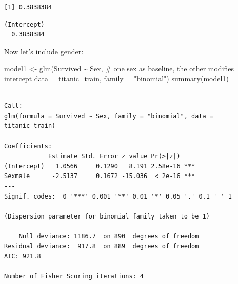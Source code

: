\documentclass[
  letterpaper,
  DIV=11,
  numbers=noendperiod]{scrreprt}
\newenvironment{Shaded}{\begin{snugshade}}{\end{snugshade}}
\newcommand{\AttributeTok}[1]{\textcolor[rgb]{0.40,0.45,0.13}{#1}}
\newcommand{\CommentTok}[1]{\textcolor[rgb]{0.37,0.37,0.37}{#1}}
\newcommand{\DecValTok}[1]{\textcolor[rgb]{0.68,0.00,0.00}{#1}}
\newcommand{\FunctionTok}[1]{\textcolor[rgb]{0.28,0.35,0.67}{#1}}
\newcommand{\NormalTok}[1]{\textcolor[rgb]{0.00,0.23,0.31}{#1}}
\newcommand{\OtherTok}[1]{\textcolor[rgb]{0.00,0.23,0.31}{#1}}
\newcommand{\SpecialCharTok}[1]{\textcolor[rgb]{0.37,0.37,0.37}{#1}}
\newcommand{\StringTok}[1]{\textcolor[rgb]{0.13,0.47,0.30}{#1}}
\begin{document}
\begin{Shaded}
\end{Shaded}

\begin{verbatim}
[1] 0.3838384
\end{verbatim}

\begin{Shaded}
\end{Shaded}

\begin{verbatim}
(Intercept) 
  0.3838384 
\end{verbatim}

Now let's include gender:

\begin{Shaded}
\begin{Highlighting}[]
\NormalTok{model1 }\OtherTok{\textless{}{-}} \FunctionTok{glm}\NormalTok{(Survived }\SpecialCharTok{\textasciitilde{}}\NormalTok{ Sex, }\CommentTok{\# one sex as baseline, the other modifies intercept}
              \AttributeTok{data =}\NormalTok{ titanic\_train,}
              \AttributeTok{family =} \StringTok{"binomial"}\NormalTok{)}
\FunctionTok{summary}\NormalTok{(model1)}
\end{Highlighting}
\end{Shaded}

\begin{verbatim}

Call:
glm(formula = Survived ~ Sex, family = "binomial", data = titanic_train)

Coefficients:
            Estimate Std. Error z value Pr(>|z|)    
(Intercept)   1.0566     0.1290   8.191 2.58e-16 ***
Sexmale      -2.5137     0.1672 -15.036  < 2e-16 ***
---
Signif. codes:  0 '***' 0.001 '**' 0.01 '*' 0.05 '.' 0.1 ' ' 1

(Dispersion parameter for binomial family taken to be 1)

    Null deviance: 1186.7  on 890  degrees of freedom
Residual deviance:  917.8  on 889  degrees of freedom
AIC: 921.8

Number of Fisher Scoring iterations: 4
\end{verbatim}
\end{document}
